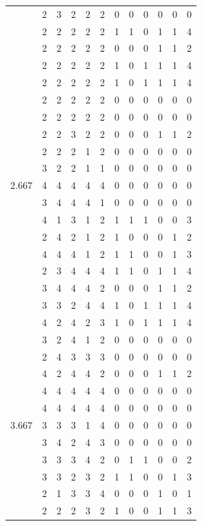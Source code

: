 \documentclass[]{msu-thesis}
\theoremstyle{definition}
\theoremstyle{definition}
\theoremstyle{definition}
\theoremstyle{remark}
\begin{document}
\begin{table}
{\begin{tabular}[t]{rrrrrrrrrrrr}
 & 2 & 3 & 2 & 2 & 2 & 0 & 0 & 0 & 0 & 0 & 0\\
 & 2 & 2 & 2 & 2 & 2 & 1 & 1 & 0 & 1 & 1 & 4\\
 & 2 & 2 & 2 & 2 & 2 & 0 & 0 & 0 & 1 & 1 & 2\\
 & 2 & 2 & 2 & 2 & 2 & 1 & 0 & 1 & 1 & 1 & 4\\
 & 2 & 2 & 2 & 2 & 2 & 1 & 0 & 1 & 1 & 1 & 4\\
 & 2 & 2 & 2 & 2 & 2 & 0 & 0 & 0 & 0 & 0 & 0\\
 & 2 & 2 & 2 & 2 & 2 & 0 & 0 & 0 & 0 & 0 & 0\\
 & 2 & 2 & 3 & 2 & 2 & 0 & 0 & 0 & 1 & 1 & 2\\
 & 2 & 2 & 2 & 1 & 2 & 0 & 0 & 0 & 0 & 0 & 0\\
 & 3 & 2 & 2 & 1 & 1 & 0 & 0 & 0 & 0 & 0 & 0\\
2.667 & 4 & 4 & 4 & 4 & 4 & 0 & 0 & 0 & 0 & 0 & 0\\
 & 3 & 4 & 4 & 4 & 1 & 0 & 0 & 0 & 0 & 0 & 0\\
 & 4 & 1 & 3 & 1 & 2 & 1 & 1 & 1 & 0 & 0 & 3\\
 & 2 & 4 & 2 & 1 & 2 & 1 & 0 & 0 & 0 & 1 & 2\\
 & 4 & 4 & 4 & 1 & 2 & 1 & 1 & 0 & 0 & 1 & 3\\
 & 2 & 3 & 4 & 4 & 4 & 1 & 1 & 0 & 1 & 1 & 4\\
 & 3 & 4 & 4 & 4 & 2 & 0 & 0 & 0 & 1 & 1 & 2\\
 & 3 & 3 & 2 & 4 & 4 & 1 & 0 & 1 & 1 & 1 & 4\\
 & 4 & 2 & 4 & 2 & 3 & 1 & 0 & 1 & 1 & 1 & 4\\
 & 3 & 2 & 4 & 1 & 2 & 0 & 0 & 0 & 0 & 0 & 0\\
 & 2 & 4 & 3 & 3 & 3 & 0 & 0 & 0 & 0 & 0 & 0\\
 & 4 & 2 & 4 & 4 & 2 & 0 & 0 & 0 & 1 & 1 & 2\\
 & 4 & 4 & 4 & 4 & 4 & 0 & 0 & 0 & 0 & 0 & 0\\
 & 4 & 4 & 4 & 4 & 4 & 0 & 0 & 0 & 0 & 0 & 0\\
3.667 & 3 & 3 & 3 & 1 & 4 & 0 & 0 & 0 & 0 & 0 & 0\\
 & 3 & 4 & 2 & 4 & 3 & 0 & 0 & 0 & 0 & 0 & 0\\
 & 3 & 3 & 3 & 4 & 2 & 0 & 1 & 1 & 0 & 0 & 2\\
 & 3 & 3 & 2 & 3 & 2 & 1 & 1 & 0 & 0 & 1 & 3\\
 & 2 & 1 & 3 & 3 & 4 & 0 & 0 & 0 & 1 & 0 & 1\\
 & 2 & 2 & 2 & 3 & 2 & 1 & 0 & 0 & 1 & 1 & 3\\

\end{tabular}}
\end{table}
\end{document}
